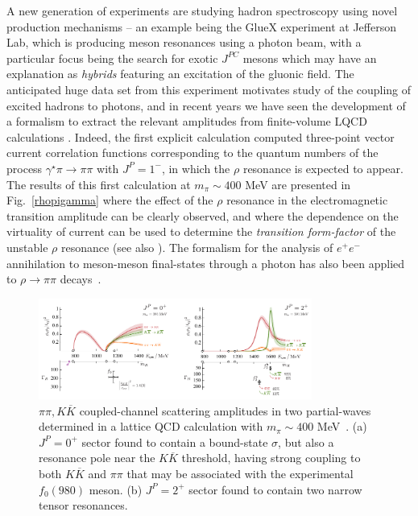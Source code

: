 A new generation of experiments are studying hadron spectroscopy using novel production mechanisms -- an example being the GlueX experiment at Jefferson Lab, which is producing meson resonances using a photon beam, with a particular focus being the search for exotic $J^{PC}$  mesons which may have an explanation as \emph{hybrids} featuring an excitation of the gluonic field. The anticipated huge data set from this experiment motivates study of the coupling of excited hadrons to photons, and in recent years we have seen the development of a formalism to extract the relevant amplitudes from finite-volume LQCD calculations \cite{Briceno:2014uqa,Briceno:2015csa,Briceno:2015tza}. Indeed, the first explicit calculation \cite{Briceno:2015dca,Briceno:2016kkp} computed three-point vector current correlation functions corresponding to the quantum numbers of the process $\gamma^\star \pi \to \pi \pi$ with $J^P=1^-$, in which the $\rho$ resonance is expected to appear. The results of this first calculation at $m_\pi \sim 400$ MeV are presented in Fig.~\ref{rhopigamma} where the effect of the $\rho$ resonance in the electromagnetic transition amplitude can be clearly observed, and where the dependence on the virtuality of current can be used to determine the \emph{transition form-factor} of the unstable $\rho$ resonance (see also \cite{Alexandrou:2018jbt}). The formalism for the analysis of  $e^+ e^-$ annihilation to meson-meson final-states through a photon has also been applied to $\rho \to \pi\pi$ decays~\cite{Feng:2014gba}.

 
\begin{figure}
\includegraphics[width=0.8\textwidth]{figures/f0f2}
\caption{$\pi\pi, K\overline{K}$ coupled-channel scattering amplitudes in two partial-waves determined in a lattice QCD calculation with $m_\pi \sim 400$ MeV~\cite{Briceno:2017qmb}. (a) $J^P=0^+$ sector found to contain a bound-state $\sigma$, but also a resonance pole near the $K\overline{K}$ threshold, having strong coupling to both $K\overline{K}$ and $\pi\pi$ that may be associated with the experimental $f_0(980)$ meson. (b) $J^P=2^+$ sector found to contain two narrow tensor resonances.}
\label{f0f2}
\end{figure}


